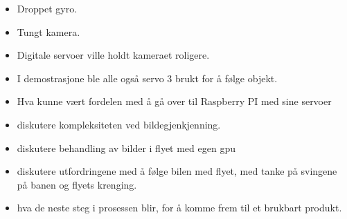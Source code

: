 \begin{itemize}
\item 
Droppet gyro.
\item 
Tungt kamera.
\item 
Digitale servoer ville holdt kameraet roligere.
\item I demostrasjone  ble alle også servo 3 brukt for å følge objekt.

\item Hva kunne vært fordelen med å gå over til Raspberry PI med sine servoer

\item diskutere kompleksiteten ved bildegjenkjenning. 

\item diskutere behandling av bilder i flyet med egen gpu

\item diskutere utfordringene med å følge bilen med flyet, med tanke på svingene på banen og flyets krenging.

\item hva de neste steg i prosessen blir, for å komme frem til et brukbart produkt. 
\end{itemize}

 

\subsection{}